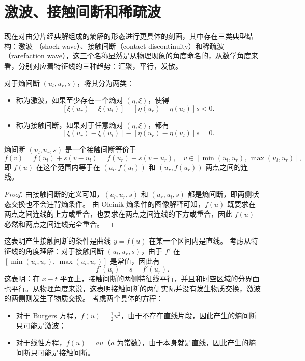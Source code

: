 \section{激波、接触间断和稀疏波}

现在对由分片经典解组成的熵解的形态进行更具体的刻画，其中存在三类典型结构：激波 （shock wave）、接触间断（contact discontinuity）和稀疏波 （rarefaction wave），这三个名称显然是从物理现象的角度命名的，从数学角度来看，分别对应着特征线的三种趋势：汇聚，平行，发散。

\begin{definition}
    对于熵间断 $(u_l,u_r,s)$，将其分为两类：
    \begin{itemize}
        \item 称为激波，如果至少存在一个熵对 $(\eta,\xi)$，使得
              \[
                  \left[\xi(u_r) - \xi(u_l)\right] - \left[\eta(u_r) - \eta(u_l)\right] s < 0.
              \]
        \item 称为接触间断，如果对于任意熵对 $(\eta,\xi)$，都有
              \[
                  \left[\xi(u_r) - \xi(u_l)\right] - \left[\eta(u_r) - \eta(u_l)\right] s = 0.
              \]
    \end{itemize}
\end{definition}

\begin{theorem}
    熵间断 $(u_l,u_r,s)$ 是一个接触间断等价于
    \[
        f(v) = f(u_l) + s(v - u_l) = f(u_r) + s(v - u_r), \quad v \in [\min(u_l, u_r),\,\max(u_l, u_r)],
    \]
    即 $f(u)$ 在这个范围内等于在 $(u_l,f(u_l))$ 和 $(u_r,f(u_r))$ 两点之间的连线。
\end{theorem}

\begin{proof}
    由接触间断的定义可知，$(u_l,u_r,s)$ 和 $(u_r,u_l,s)$ 都是熵间断，即两侧状态交换也不会违背熵条件。
    由 Oleinik 熵条件的图像解释可知，$f(u)$ 既要求在两点之间连线的上方或重合，也要求在两点之间连线的下方或重合，因此 $f(u)$ 必然和两点之间连线完全重合。
\end{proof}

这表明产生接触间断的条件是曲线 $y=f(u)$ 在某一个区间内是直线。
考虑从特征线的角度理解：对于接触间断 $(u_l,u_r,s)$，由于 $f'$ 在 $[\min(u_l, u_r),\,\max(u_l, u_r)]$ 是常值，因此有
\[
    f'(u_l) = s = f'(u_r).
\]
这表明：在 $x\!-\!t$ 平面上，接触间断的两侧特征线平行，并且和时空区域的分界面也平行。从物理角度来说，这表明接触间断的两侧实际并没有发生物质交换，激波的两侧则发生了物质交换。
考虑两个具体的方程：
\begin{itemize}
    \item 对于 Burgers 方程，$f(u) = \frac12 u^2$，由于不存在直线片段，因此产生的熵间断只可能是激波；
    \item 对于线性方程，$f(u) = a u$（$a$ 为常数），由于本身就是直线，因此产生的熵间断只可能是接触间断。
\end{itemize}

